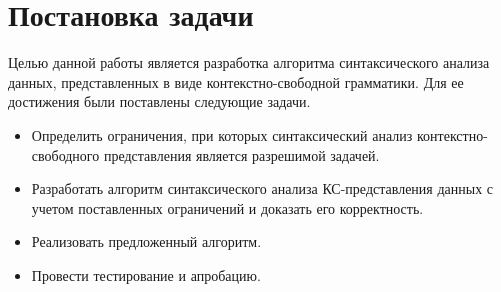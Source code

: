 \section{Постановка задачи}
Целью данной работы является разработка алгоритма синтаксического анализа данных, представленных в виде контекстно-свободной грамматики. Для ее достижения были поставлены следующие задачи.
\begin{itemize}
	\item Определить ограничения, при которых синтаксический анализ \linebreak контекстно-свободного представления является разрешимой задачей.
	\item Разработать алгоритм синтаксического анализа КС-представления данных с учетом поставленных ограничений и доказать его корректность.
	\item Реализовать предложенный алгоритм.
	\item Провести тестирование и апробацию.
\end{itemize}